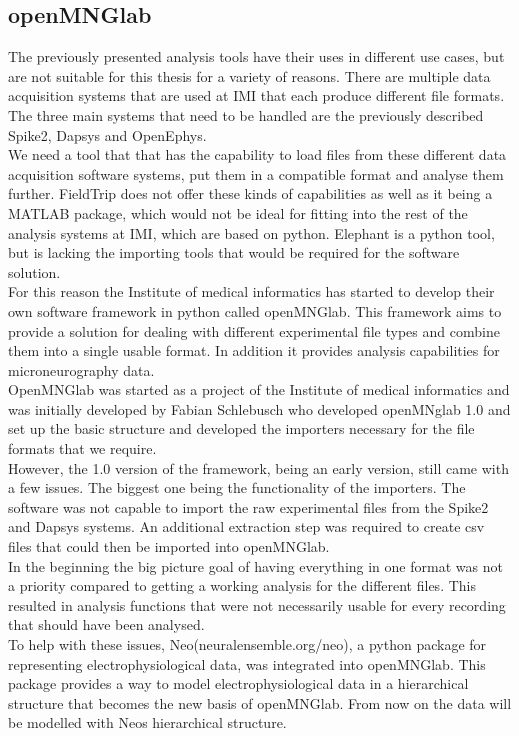 \subsection{openMNGlab}
The previously presented analysis tools have their uses in different use cases, but are not suitable for this thesis for a variety of reasons.
There are multiple data acquisition systems that are used at IMI that each produce different file formats. The three main systems that need to be handled are the previously described Spike2, Dapsys and OpenEphys. \\ 
We need a tool that that has the capability to load files from these different data acquisition software systems, put them in a compatible format and analyse them further.  FieldTrip does not offer these kinds of capabilities as well as it being a MATLAB package, which would not be ideal for fitting into the rest of the analysis systems at IMI, which are based on python. Elephant is a python tool, but is lacking the importing tools that would be required for the software solution.  \\
For this reason the Institute of medical informatics has started to develop their own software framework in python called openMNGlab.  This framework aims to provide a solution for dealing with different experimental file types and combine them into a single usable format.  In addition it provides analysis capabilities for microneurography data. \\
OpenMNGlab was started as a project of the Institute of medical informatics and was initially developed by Fabian Schlebusch who developed openMNglab 1.0 and set up the basic structure and developed the importers necessary for the file formats that we require. \\
However, the 1.0 version of the framework, being an early version,  still came with a few issues. The biggest one being the functionality of the importers. The software was not capable to import the raw experimental files from the Spike2 and Dapsys systems. An additional extraction step was required to create csv files that could then be imported into openMNGlab. \\
In the beginning the big picture goal of having everything in one format was not a priority compared to getting a working analysis for the different files. This resulted in analysis functions that were not necessarily usable for every recording that should have been analysed.\\
To help with these issues, Neo(neuralensemble.org/neo), a python package for representing electrophysiological data, was integrated into openMNGlab. This package provides a way to model electrophysiological data in a hierarchical structure that becomes the new basis of openMNGlab. From now on the data will be modelled with Neos hierarchical structure. 

